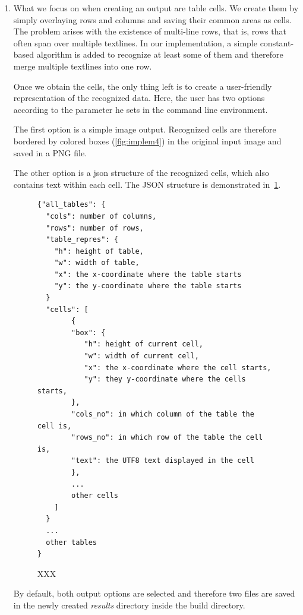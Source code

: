 \begin{enumerate}
\item \emph{}

What we focus on when creating an output are table cells. We create them by simply overlaying rows and columns and saving their common areas as cells. The problem arises with the existence of multi-line rows, that is, rows that often span over multiple textlines. In our implementation, a simple constant-based algorithm is added to recognize at least some of them and therefore merge multiple textlines into one row.

Once we obtain the cells, the only thing left is to create a user-friendly representation of the recognized data. Here, the user has two options according to the parameter he sets in the command line environment. 

The first option is a simple image output. Recognized cells are therefore bordered by colored boxes (\cref{fig:implem4}) in the original input image and saved in a PNG file.

The other option is a json structure of the recognized cells, which also contains text within each cell. The JSON structure is demonstrated in~\cref{fig:jsonout}.

\begin{figure}[p]
\begin{lstlisting}
{"all_tables": {
  "cols": number of columns,
  "rows": number of rows,
  "table_repres": {
    "h": height of table,
    "w": width of table,
    "x": the x-coordinate where the table starts
    "y": the y-coordinate where the table starts
  }
  "cells": [
        {
        "box": {
           "h": height of current cell,
           "w": width of current cell,
           "x": the x-coordinate where the cell starts,
           "y": they y-coordinate where the cells starts,
        },
        "cols_no": in which column of the table the cell is,
        "rows_no": in which row of the table the cell is,
        "text": the UTF8 text displayed in the cell
        },
        ...
        other cells
    ]
  }
  ...
  other tables
}
\end{lstlisting}
\caption{XXX}
\label{fig:jsonout}
\end{figure}

By default, both output options are selected and therefore two files are saved in the newly created \emph{results} directory inside the build directory.

\end{enumerate}

